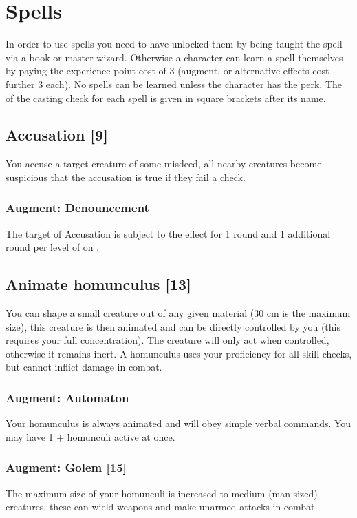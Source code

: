 \section{Spells}
\label{sec:spells}

In order to use spells you need to have unlocked them by being taught the spell via a book or master wizard. Otherwise a character can learn a spell themselves by paying the experience point cost of 3 (augment, or alternative effects cost further 3 each). No spells can be learned unless the character has the  perk. The  of the casting check for each spell is given in square brackets after its name.

\subsection{Accusation [9]}
You accuse a target creature of some misdeed, all nearby creatures become suspicious that the accusation is true if they fail a  check.
\subsubsection{Augment: Denouncement}
The target of Accusation is subject to the  effect for 1 round and 1 additional round per level of  on .

\subsection{Animate homunculus [13]}
You can shape a small creature out of any given material (30 cm is the maximum size), this creature is then animated and can be directly controlled by you (this requires your full concentration). The creature will only act when controlled, otherwise it remains inert. A homunculus uses your  proficiency for all skill checks, but cannot inflict damage in combat.
\subsubsection{Augment: Automaton}
Your homunculus is always animated and will obey simple verbal commands. You may have 1 +  homunculi active at once. 
\subsubsection{Augment: Golem [15]}
The maximum size of your homunculi is increased to medium (man-sized) creatures, these can wield weapons and make unarmed attacks in combat.

